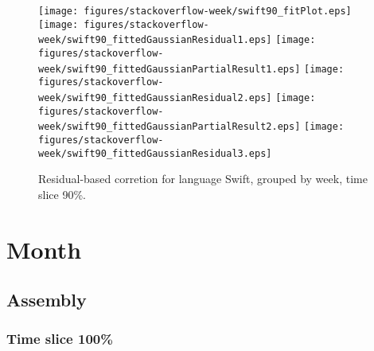 \begin{figure}[hb]
\centering
{}
{\texttt{[image: figures/stackoverflow-week/swift90\_fitPlot.eps]}}
{\texttt{[image: figures/stackoverflow-week/swift90\_fittedGaussianResidual1.eps]}}
{\texttt{[image: figures/stackoverflow-week/swift90\_fittedGaussianPartialResult1.eps]}}
{\texttt{[image: figures/stackoverflow-week/swift90\_fittedGaussianResidual2.eps]}}
{\texttt{[image: figures/stackoverflow-week/swift90\_fittedGaussianPartialResult2.eps]}}
{\texttt{[image: figures/stackoverflow-week/swift90\_fittedGaussianResidual3.eps]}}
\caption{Residual-based corretion for language Swift, grouped by week, time slice 90\%.}
\end{figure}


\clearpage 
\newpage 


\section{Month}

\subsection{Assembly}

\FloatBarrier

\subsubsection{Time slice 100\%}

